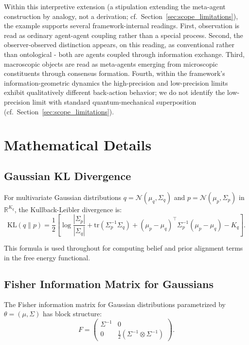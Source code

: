 \documentclass[11pt]{article}
\begin{document}
Within this interpretive extension (a stipulation extending the meta-agent construction by analogy, not a derivation; cf.\ Section~\ref{sec:scope_limitations}), the example supports several framework-internal readings. First, observation is read as ordinary agent-agent coupling rather than a special process. Second, the observer-observed distinction appears, on this reading, as conventional rather than ontological - both are agents coupled through information exchange. Third, macroscopic objects are read as meta-agents emerging from microscopic constituents through consensus formation. Fourth, within the framework's information-geometric dynamics the high-precision and low-precision limits exhibit qualitatively different back-action behavior; we do not identify the low-precision limit with standard quantum-mechanical superposition (cf.\ Section~\ref{sec:scope_limitations}).

\section{Mathematical Details}
\label{app:math}

\subsection{Gaussian KL Divergence}
\label{app:gaussian_kl}

For multivariate Gaussian distributions $q = \mathcal{N}(\mu_q, \Sigma_q)$ and $p = \mathcal{N}(\mu_p, \Sigma_p)$ in $\mathbb{R}^{K_q}$, the Kullback-Leibler divergence is:
\begin{equation}
\mathrm{KL}(q \| p) = \frac{1}{2}\left[\log\frac{|\Sigma_p|}{|\Sigma_q|} + \mathrm{tr}(\Sigma_p^{-1}\Sigma_q) + (\mu_p - \mu_q)^\top\Sigma_p^{-1}(\mu_p - \mu_q) - K_q\right].
\end{equation}

This formula is used throughout for computing belief and prior alignment terms in the free energy functional.

\subsection{Fisher Information Matrix for Gaussians}
\label{app:fisher_gaussian}

The Fisher information matrix for Gaussian distributions parametrized by $\theta = (\mu, \Sigma)$ has block structure:
\begin{equation}
F = \begin{pmatrix}
\Sigma^{-1} & 0 \\
0 & \frac{1}{2}(\Sigma^{-1} \otimes \Sigma^{-1})
\end{pmatrix}.
\end{equation}
\end{document}
